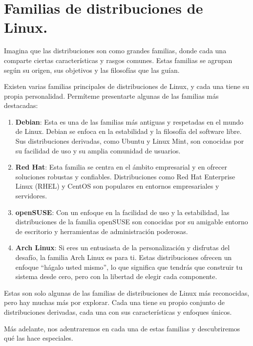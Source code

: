 \documentclass[
  a4paper,
]{article}
\begin{document}
\hypertarget{familias-de-distribuciones-de-linux.}{%
\section{Familias de distribuciones de
Linux.}\label{familias-de-distribuciones-de-linux.}}

Imagina que las distribuciones son como grandes familias, donde cada una
comparte ciertas características y rasgos comunes. Estas familias se
agrupan según su origen, sus objetivos y las filosofías que las guían.

Existen varias familias principales de distribuciones de Linux, y cada
una tiene su propia personalidad. Permíteme presentarte algunas de las
familias más destacadas:

\begin{enumerate}
\def\labelenumi{\arabic{enumi}.}
\item
  \textbf{Debian}: Esta es una de las familias más antiguas y respetadas
  en el mundo de Linux. Debian se enfoca en la estabilidad y la
  filosofía del software libre. Sus distribuciones derivadas, como
  Ubuntu y Linux Mint, son conocidas por su facilidad de uso y su amplia
  comunidad de usuarios.
\item
  \textbf{Red Hat}: Esta familia se centra en el ámbito empresarial y en
  ofrecer soluciones robustas y confiables. Distribuciones como Red Hat
  Enterprise Linux (RHEL) y CentOS son populares en entornos
  empresariales y servidores.
\item
  \textbf{openSUSE}: Con un enfoque en la facilidad de uso y la
  estabilidad, las distribuciones de la familia openSUSE son conocidas
  por su amigable entorno de escritorio y herramientas de administración
  poderosas.
\item
  \textbf{Arch Linux}: Si eres un entusiasta de la personalización y
  disfrutas del desafío, la familia Arch Linux es para ti. Estas
  distribuciones ofrecen un enfoque ``hágalo usted mismo'', lo que
  significa que tendrás que construir tu sistema desde cero, pero con la
  libertad de elegir cada componente.
\end{enumerate}

Estas son solo algunas de las familias de distribuciones de Linux más
reconocidas, pero hay muchas más por explorar. Cada una tiene su propio
conjunto de distribuciones derivadas, cada una con sus características y
enfoques únicos.

Más adelante, nos adentraremos en cada una de estas familias y
descubriremos qué las hace especiales.
\end{document}
